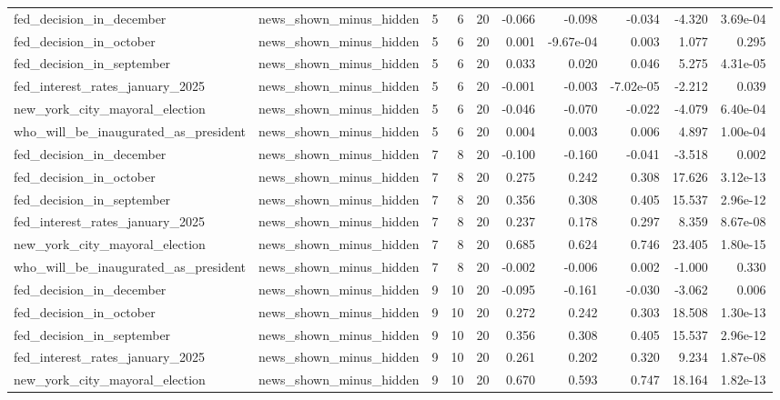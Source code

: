 \begin{longtable}{llrrrrrrrr}
fed\_decision\_in\_december & news\_shown\_minus\_hidden & 5 & 6 & 20 & -0.066 & -0.098 & -0.034 & -4.320 & 3.69e-04 \\
fed\_decision\_in\_october & news\_shown\_minus\_hidden & 5 & 6 & 20 & 0.001 & -9.67e-04 & 0.003 & 1.077 & 0.295 \\
fed\_decision\_in\_september & news\_shown\_minus\_hidden & 5 & 6 & 20 & 0.033 & 0.020 & 0.046 & 5.275 & 4.31e-05 \\
fed\_interest\_rates\_january\_2025 & news\_shown\_minus\_hidden & 5 & 6 & 20 & -0.001 & -0.003 & -7.02e-05 & -2.212 & 0.039 \\
new\_york\_city\_mayoral\_election & news\_shown\_minus\_hidden & 5 & 6 & 20 & -0.046 & -0.070 & -0.022 & -4.079 & 6.40e-04 \\
who\_will\_be\_inaugurated\_as\_president & news\_shown\_minus\_hidden & 5 & 6 & 20 & 0.004 & 0.003 & 0.006 & 4.897 & 1.00e-04 \\
fed\_decision\_in\_december & news\_shown\_minus\_hidden & 7 & 8 & 20 & -0.100 & -0.160 & -0.041 & -3.518 & 0.002 \\
fed\_decision\_in\_october & news\_shown\_minus\_hidden & 7 & 8 & 20 & 0.275 & 0.242 & 0.308 & 17.626 & 3.12e-13 \\
fed\_decision\_in\_september & news\_shown\_minus\_hidden & 7 & 8 & 20 & 0.356 & 0.308 & 0.405 & 15.537 & 2.96e-12 \\
fed\_interest\_rates\_january\_2025 & news\_shown\_minus\_hidden & 7 & 8 & 20 & 0.237 & 0.178 & 0.297 & 8.359 & 8.67e-08 \\
new\_york\_city\_mayoral\_election & news\_shown\_minus\_hidden & 7 & 8 & 20 & 0.685 & 0.624 & 0.746 & 23.405 & 1.80e-15 \\
who\_will\_be\_inaugurated\_as\_president & news\_shown\_minus\_hidden & 7 & 8 & 20 & -0.002 & -0.006 & 0.002 & -1.000 & 0.330 \\
fed\_decision\_in\_december & news\_shown\_minus\_hidden & 9 & 10 & 20 & -0.095 & -0.161 & -0.030 & -3.062 & 0.006 \\
fed\_decision\_in\_october & news\_shown\_minus\_hidden & 9 & 10 & 20 & 0.272 & 0.242 & 0.303 & 18.508 & 1.30e-13 \\
fed\_decision\_in\_september & news\_shown\_minus\_hidden & 9 & 10 & 20 & 0.356 & 0.308 & 0.405 & 15.537 & 2.96e-12 \\
fed\_interest\_rates\_january\_2025 & news\_shown\_minus\_hidden & 9 & 10 & 20 & 0.261 & 0.202 & 0.320 & 9.234 & 1.87e-08 \\
new\_york\_city\_mayoral\_election & news\_shown\_minus\_hidden & 9 & 10 & 20 & 0.670 & 0.593 & 0.747 & 18.164 & 1.82e-13 \\

\end{longtable}
